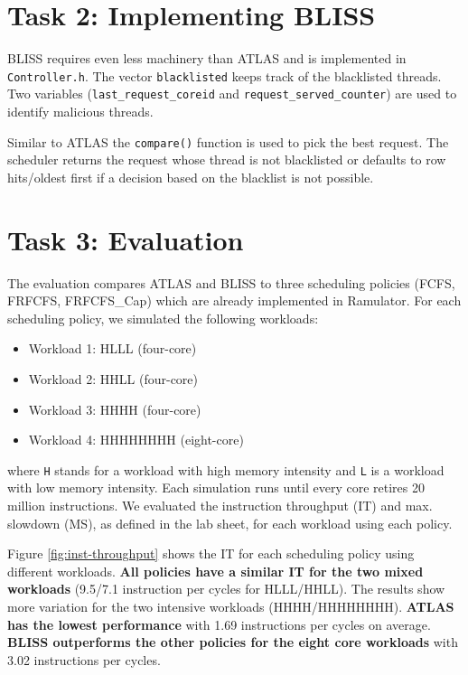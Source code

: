 \documentclass[a4paper]{article}
\newcommand{\wl}[1]{\textsf{\small #1}}
\begin{document}
\newpage

\section*{Task 2: Implementing BLISS}

BLISS requires even less machinery than ATLAS and is implemented in
\verb|Controller.h|. The vector \verb|blacklisted| keeps track of the
blacklisted threads. Two variables (\verb|last_request_coreid| and
\verb|request_served_counter|) are used to identify malicious threads.

Similar to ATLAS the \verb|compare()| function is used to pick the best request.
The scheduler returns the request whose thread is not blacklisted or defaults to
row hits/oldest first if a decision based on the blacklist is not possible.

\section*{Task 3: Evaluation}

The evaluation compares ATLAS and BLISS to three scheduling policies (FCFS,
FRFCFS, FRFCFS\_Cap) which are already implemented in Ramulator. For each
scheduling policy, we simulated the following workloads:
\begin{itemize}
    \item Workload 1: \wl{HLLL} (four-core)
    \item Workload 2: \wl{HHLL} (four-core)
    \item Workload 3: \wl{HHHH} (four-core)
    \item Workload 4: \wl{HHHHHHHH} (eight-core)
\end{itemize}
where \texttt{H} stands for a workload with high memory intensity and \texttt{L}
is a workload with low memory intensity. Each simulation runs until every core
retires 20 million instructions. We evaluated the instruction throughput (IT)
and max. slowdown (MS), as defined in the lab sheet, for each workload using
each policy.

Figure \ref{fig:inst-throughput} shows the IT for each scheduling policy using
different workloads. \textbf{All policies have a similar IT for the two mixed
workloads} (9.5/7.1 instruction per cycles for \wl{HLLL}/\wl{HHLL}). The results
show more variation for the two intensive workloads (\wl{HHHH/HHHHHHHH}).
\textbf{ATLAS has the lowest performance} with 1.69 instructions per cycles on
average. \textbf{BLISS outperforms the other policies for the eight core
workloads} with 3.02 instructions per cycles.
\end{document}
